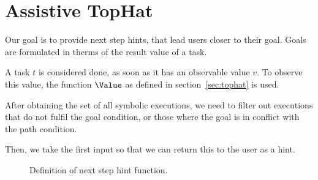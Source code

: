 
\section{Assistive TopHat}
\label{sec:assistive}

Our goal is to provide next step hints, that lead users closer to their goal.
Goals are formulated in therms of the result value of a task.

A task $t$ is considered done, as soon as it has an observable value $v$.
To observe this value, the function $\Value$ as defined in section~\ref{sec:tophat} is used.

After obtaining the set of all symbolic executions, we need to filter out executions that do not fulfil the goal condition, or those where the goal is in conflict with the path condition.

Then, we take the first input so that we can return this to the user as a hint.

\begin{figure}
  \caption{Definition of next step hint function.}
  \label{}
\end{figure}
